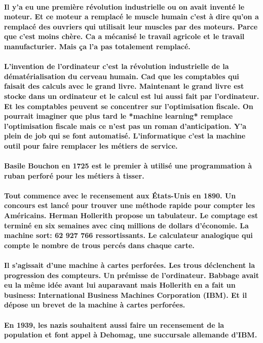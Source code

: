 \paragraph{
  Il y'a eu une première révolution industrielle ou on avait inventé le moteur. Et ce moteur a remplacé le muscle humain c'est à dire qu'on a remplacé des ouvriers qui utilisait leur muscles par des moteurs. Parce que c'est moins chère. Ca a mécanisé le travail agricole et le travail manufacturier. Mais ça l'a pas totalement remplacé.
}

\paragraph{
  L'invention de l'ordinateur c'est la révolution industrielle de la dématérialisation du cerveau humain. Cad que les comptables qui faisait des calculs avec le grand livre. Maintenant le grand livre est stocke dans un ordinateur et le calcul est lui aussi fait par l'ordinateur. Et les comptables peuvent se concentrer sur l'optimisation fiscale. On pourrait imaginer que plus tard le *machine learning* remplace l'optimisation fiscale mais ce n'est pas un roman d'anticipation. Y'a plein de job qui se font automatisé. L'informatique c'est la machine outil pour faire remplacer les métiers de service.
}

\paragraph{
  Basile Bouchon en 1725 est le premier à utilisé une programmation à ruban perforé pour les métiers à tisser.
}

\paragraph{
  Tout commence avec le recensement aux États-Unis en 1890. Un concours est lancé pour trouver une méthode rapide pour compter les Américains. Herman Hollerith propose un tabulateur. Le comptage est terminé en six semaines avec cinq millions de dollars d'économie. La machine sort: 62 927 766 ressortissants. Le calculateur analogique qui compte le nombre de trous percés dans chaque carte.
}

\paragraph{
  Il s'agissait d'une machine à cartes perforées. Les trous déclenchent la progression des compteurs. Un prémisse de l'ordinateur. Babbage avait eu la même idée avant lui auparavant mais Hollerith en a fait un business: International Business Machines Corporation (IBM). Et il dépose un brevet de la machine à cartes perforées.
}

\paragraph{
  En 1939, les nazis souhaitent aussi faire un recensement de la population et font appel à Dehomag, une succursale allemande d'IBM.
}
